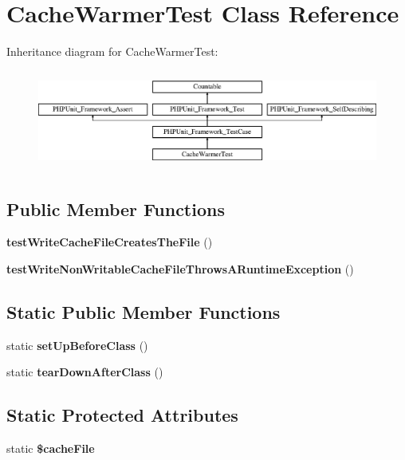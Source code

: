 \section{Cache\+Warmer\+Test Class Reference}
\label{class_symfony_1_1_component_1_1_http_kernel_1_1_tests_1_1_cache_warmer_1_1_cache_warmer_test}
Inheritance diagram for Cache\+Warmer\+Test\+:\begin{figure}[H]
\begin{center}
\leavevmode
\includegraphics[height=3.303835cm]{class_symfony_1_1_component_1_1_http_kernel_1_1_tests_1_1_cache_warmer_1_1_cache_warmer_test}
\end{center}
\end{figure}
\subsection*{Public Member Functions}
\begin{DoxyCompactItemize}
\item 
{\bf test\+Write\+Cache\+File\+Creates\+The\+File} ()
\item 
{\bf test\+Write\+Non\+Writable\+Cache\+File\+Throws\+A\+Runtime\+Exception} ()
\end{DoxyCompactItemize}
\subsection*{Static Public Member Functions}
\begin{DoxyCompactItemize}
\item 
static {\bf set\+Up\+Before\+Class} ()
\item 
static {\bf tear\+Down\+After\+Class} ()
\end{DoxyCompactItemize}
\subsection*{Static Protected Attributes}
\begin{DoxyCompactItemize}
\item 
static {\bf \$cache\+File}
\end{DoxyCompactItemize}
